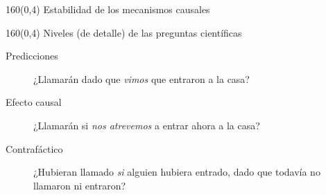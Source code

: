 \documentclass[shownotes,aspectratio=169]{beamer}
\begin{document}
\begin{frame}[plain]
 \begin{textblock}{160}(0,4)
 \centering \Large
 Estabilidad de los mecanismos causales
 \end{textblock}

 
 
\end{frame}


\begin{frame}[plain]
 \begin{textblock}{160}(0,4)
 \centering \Large
Niveles (de detalle) de las preguntas científicas
 \end{textblock}
 \vspace{0.75cm}
 
 \large
 \begin{description}
  \item[Predicciones] ¿Llamarán dado que \emph{vimos} que entraron a la casa?\\[0.2cm] \pause
  \item[Efecto causal] ¿Llamarán si \emph{nos atrevemos} a entrar ahora a la casa?\\[0.2cm] \pause
  \item[Contrafáctico] ¿Hubieran llamado \emph{si} alguien hubiera entrado, dado que todavía no llamaron ni entraron?
 \end{description}
 
 \end{frame}

 
 
\end{document}
